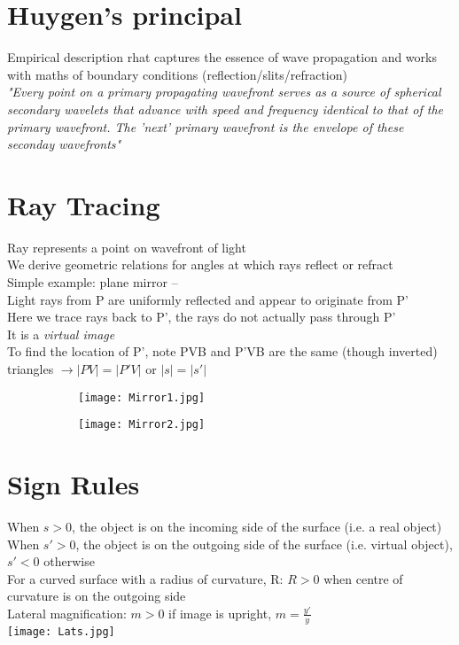 \documentclass[a4paper, 11pt, fleqn, normalem]{report}
\begin{document}
\section{Huygen's principal}
Empirical description rhat captures the essence of wave propagation and works with maths of boundary conditions (reflection/slits/refraction) \\
\emph{"Every point on a primary propagating wavefront serves as a source of spherical secondary wavelets that advance with speed and frequency identical to that of the primary wavefront. The 'next' primary wavefront is the envelope of these seconday wavefronts"}

\section{Ray Tracing}
Ray represents a point on wavefront of light \\
We derive geometric relations for angles at which rays reflect or refract \\
Simple example: plane mirror -- \\
Light rays from P are uniformly reflected and appear to originate from P' \\
Here we trace rays back to P', the rays do not actually pass through P' \\
It is a \emph{virtual image} \\
To find the location of P', note PVB and P'VB are the same (though inverted) triangles $\rightarrow |PV| = |P'V|$ or $|s| = |s'|$
\begin{figure}[H]
    \begin{subfigure}{0.4\textwidth}
        \texttt{[image: Mirror1.jpg]}
    \end{subfigure}
    \begin{subfigure}{0.4\textwidth}
        \texttt{[image: Mirror2.jpg]}
    \end{subfigure}
\end{figure}

\section{Sign Rules}
When $s > 0$, the object is on the incoming side of the surface (i.e. a real object) \\
When $s' > 0$, the object is on the outgoing side of the surface (i.e. virtual object), $s' < 0$ otherwise \\
For a curved surface with a radius of curvature, R: $R > 0$ when centre of curvature is on the outgoing side \\
Lateral magnification: $m > 0$ if image is upright, $m = \frac{y'}{y}$ \\
\texttt{[image: Lats.jpg]}
\end{document}
